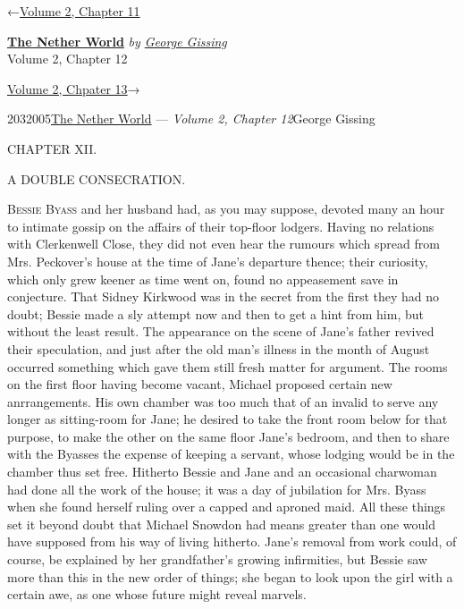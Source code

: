 \hypertarget{headerContainer}{}
\hypertarget{navigationHeader}{}
\protect\hypertarget{headerprevious}{}{←\href{/wiki/The_Nether_World/Volume_2/Chapter_11}{Volume
2, Chapter 11}}

\textbf{\protect\hypertarget{header_title_text}{}{\href{/wiki/The_Nether_World}{The
Nether World}}} \emph{by
\href{/wiki/Author:George_Gissing}{\protect\hypertarget{header_author_text}{}{{George
Gissing}}}}\\
\protect\hypertarget{header_section_text}{}{Volume 2, Chapter 12}

\protect\hypertarget{headernext}{}{\href{/wiki/The_Nether_World/Volume_2/Chapter_13}{Volume
2, Chpater 13}→}

\hypertarget{navigationNotes}{}

\hypertarget{ws-data}{}
\protect\hypertarget{ws-article-id}{}{2032005}\protect\hypertarget{ws-title}{}{\href{/wiki/The_Nether_World}{The
Nether World} --- \emph{Volume 2, Chapter
12}}\protect\hypertarget{ws-author}{}{George Gissing}

{\protect\hypertarget{245}{}{}}

{CHAPTER XII.}

A DOUBLE CONSECRATION.

\textsc{Bessie Byass} and her husband had, as you may suppose, devoted
many an hour to intimate gossip on the affairs of their top-floor
lodgers. Having no relations with Clerkenwell Close, they did not even
hear the rumours which spread from Mrs. Peckover's house at the time of
Jane's departure thence; their curiosity, which only grew keener as time
went on, found no appeasement save in conjecture. That Sidney Kirkwood
was in the secret from the first they had no doubt; Bessie made a sly
attempt now and then to get a hint from him, but without the least
result. The appearance on the scene of Jane's father revived their
speculation, and just after the old man's illness in the month of August
occurred something which gave them still fresh matter for
{\protect\hypertarget{246}{}{}}argument. The rooms on the first floor
having become vacant, Michael proposed certain new anrrangements. His
own chamber was too much that of an invalid to serve any longer as
sitting-room for Jane; he desired to take the front room below for that
purpose, to make the other on the same floor Jane's bedroom, and then to
share with the Byasses the expense of keeping a servant, whose lodging
would be in the chamber thus set free. Hitherto Bessie and Jane and an
occasional charwoman had done all the work of the house; it was a day of
jubilation for Mrs. Byass when she found herself ruling over a capped
and aproned maid. All these things set it beyond doubt that Michael
Snowdon had means greater than one would have supposed from his way of
living hitherto. Jane's removal from work could, of course, be explained
by her grandfather's growing infirmities, but Bessie saw more than this
in the new order of things; she began to look upon the girl with a
certain awe, as one whose future might reveal marvels.

